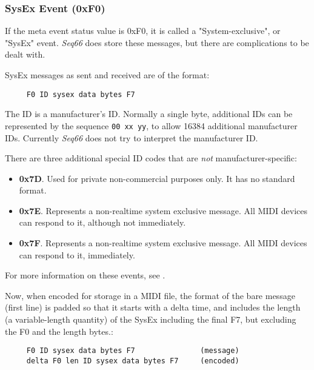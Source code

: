 \subsubsection{SysEx Event (0xF0)}
\label{subsubsec:midi_format_meta_sysex_event}

   If the meta event status value is 0xF0, it is called a "System-exclusive",
   or "SysEx" event.
   \textsl{Seq66} does store these messages, but there are complications
   to be dealt with.

   SysEx messages as sent and received are of the format:

   \begin{verbatim}
     F0 ID sysex data bytes F7
   \end{verbatim}

   The ID is a manufacturer's ID. Normally a single byte, additional IDs can be
   represented by the sequence \texttt{00 xx yy}, to allow 16384 additional
   manufacturer IDs.  Currently \textsl{Seq66} does not try to interpret the
   manufacturer ID.

   There are three additional special ID codes that are \textsl{not}
   manufacturer-specific:

   \begin{itemize}
      \item \textbf{0x7D}.
         Used for private non-commercial purposes only.
         It has no standard format.
      \item \textbf{0x7E}.
         Represents a non-realtime system exclusive message.
         All MIDI devices can respond to it, although not immediately.
      \item \textbf{0x7F}.
         Represents a non-realtime system exclusive message.
         All MIDI devices can respond to it, immediately.
   \end{itemize}

   For more information on these events, see
   .

   Now, when encoded for storage in a MIDI file, the format of the bare message
   (first line) is padded so that it starts with a delta time, and includes the
   length (a variable-length quantity) of the SysEx including the final F7, but
   excluding the F0 and the length bytes.:

   \begin{verbatim}
     F0 ID sysex data bytes F7               (message)
     delta F0 len ID sysex data bytes F7     (encoded)
   \end{verbatim}


